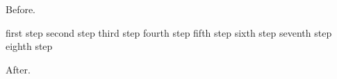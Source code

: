 \documentclass{article}
\begin{document}
Before.
\begin{algorithm}
\caption{example}
first step\;
second step\;
third step\;
fourth step\;
fifth step\;
sixth step\;
seventh step\;
eighth step\;
\end{algorithm}
After.
\end{document}
